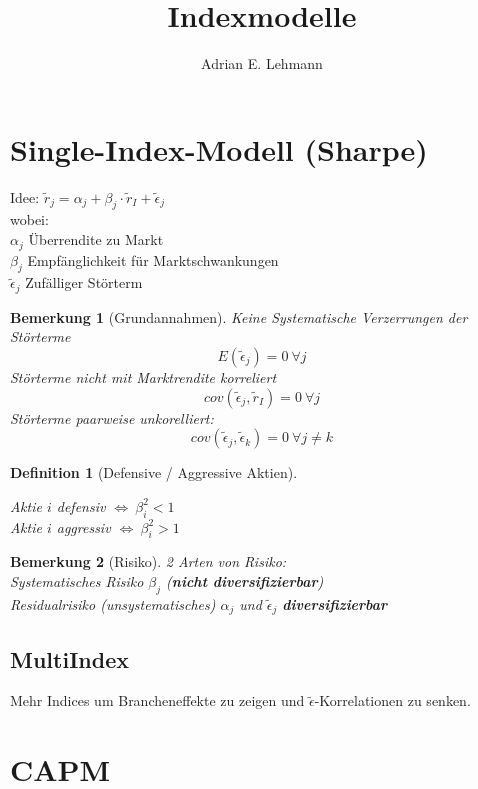 \documentclass[a4paper]{article}
\title{Indexmodelle}
\author{Adrian E. Lehmann}
\theoremstyle{break}
\newtheorem{defi}{Definition}[section]
\newtheorem{ann}{Bemerkung}[section]
\begin{document}
        \maketitle
        \tableofcontents
        \newpage
        
\section{Single-Index-Modell (Sharpe)}
Idee: $\tilde{r}_j = \alpha_j + \beta_j \cdot \tilde{r}_I + \tilde{\epsilon}_j$\\
wobei:\\
$\alpha_j$ Überrendite zu Markt\\
$\beta_j$ Empfänglichkeit für Marktschwankungen\\
$\tilde{\epsilon}_j$ Zufälliger Störterm\\

\begin{ann}[Grundannahmen]
    Keine Systematische Verzerrungen der Störterme
        $$E(\tilde{\epsilon}_j) = 0 ~ \forall j$$
    Störterme nicht mit Marktrendite korreliert
        $$cov(\tilde{\epsilon}_j, \tilde{r}_I) = 0 ~ \forall j$$
    Störterme paarweise unkorelliert:
         $$cov(\tilde{\epsilon}_j, \tilde{\epsilon}_k) = 0 ~ \forall j \neq k$$
\end{ann}
\begin{defi}[Defensive / Aggressive Aktien]
    \begin{center}
        Aktie $i$ defensiv $\Longleftrightarrow ~ \beta^{2}_i < 1 $\\
        Aktie $i$ aggressiv $\Longleftrightarrow ~ \beta^{2}_i > 1 $
    \end{center}
\end{defi}
\begin{ann}[Risiko]
    2 Arten von Risiko:\\
    Systematisches Risiko $\beta_j$ (\textbf{nicht diversifizierbar})\\
    Residualrisiko (unsystematisches) $\alpha_j$ und $\tilde{\epsilon}_j$ \textbf{diversifizierbar} 
\end{ann}
\subsection{MultiIndex}
Mehr Indices um Brancheneffekte zu zeigen und $\tilde{\epsilon}$-Korrelationen zu senken.

\section{CAPM}
\end{document}
